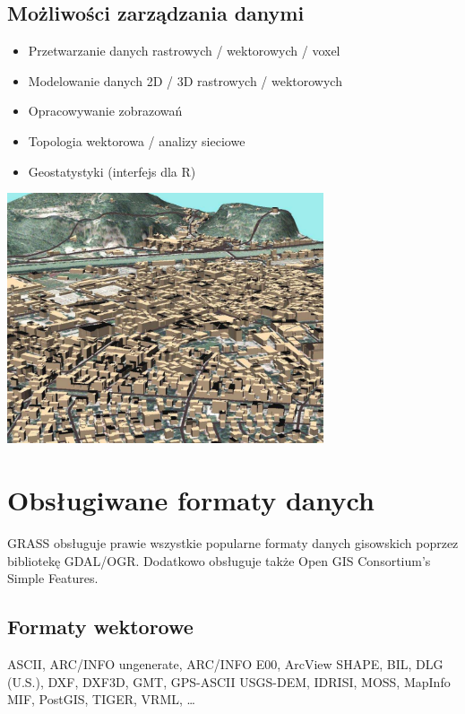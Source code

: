 \documentclass[notumble,a4paper,10pt,nofoldmark]{leaflet}
\newenvironment{myfig}[1][0pt plus 1.5ex minus .5ex]{\par\vspace*{#1}\begin{minipage}{\textwidth}\centering}{\end{minipage}}
\begin{document}
\subsection{Możliwości zarządzania danymi}

\begin{itemize}
\item Przetwarzanie danych rastrowych / wektorowych / voxel
\item Modelowanie danych 2D / 3D rastrowych / wektorowych 
\item Opracowywanie zobrazowań
\item Topologia wektorowa / analizy sieciowe
\item Geostatystyki (interfejs dla R)
\end{itemize}

\begin{myfig}[1ex]
\includegraphics[width=0.7\textwidth]{pix/trento3d}
\end{myfig}

\section{Obsługiwane formaty danych}

GRASS obsługuje prawie wszystkie popularne formaty danych gisowskich poprzez bibliotekę GDAL/OGR. Dodatkowo obsługuje także Open GIS Consortium's Simple Features.

\subsection{Formaty wektorowe}
ASCII, ARC/INFO ungenerate, ARC/INFO E00, Arc\-View SHAPE, BIL, DLG (U.S.), DXF, DXF3D, GMT, GPS-ASCII USGS-DEM, IDRISI, MOSS, MapInfo MIF, PostGIS, TIGER, VRML, \dots
\end{document}
